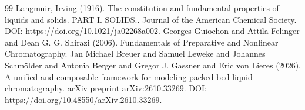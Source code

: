 \documentclass{article}
\begin{document}
\begin{thebibliography}{99}
     Langmuir, Irving (1916). The constitution and fundamental properties of liquids and solids. PART I. SOLIDS.. Journal of the American Chemical Society. DOI: https://doi.org/10.1021/ja02268a002.
     Georges Guiochon and Attila Felinger and Dean G. G. Shirazi (2006). Fundamentals of Preparative and Nonlinear Chromatography.
     Jan Michael Breuer and Samuel Leweke and Johannes Schmölder and Antonia Berger and Gregor J. Gassner and Eric von Lieres (2026). A unified and composable framework for modeling packed-bed liquid chromatography. arXiv preprint arXiv:2610.33269. DOI: https://doi.org/10.48550/arXiv.2610.33269.
\end{thebibliography}
\end{document}
